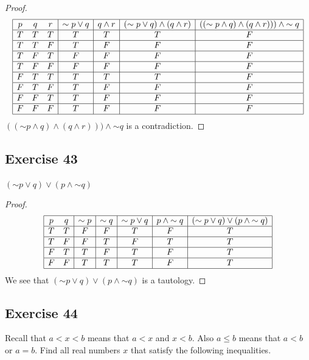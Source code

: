 \documentclass[14pt]{extarticle}
\begin{document}
\begin{proof} 
$$ 
\begin{array}{|ccc|c|c|c|c|} 
\hline 
p & q & r & {\sim p} \vee q & q \wedge r & ({\sim p} \vee q) \wedge (q \wedge r)& (({\sim p} \wedge q) \wedge (q \wedge r))) \wedge {\sim q} \\ 
\hline 
T & T & T & T & T & T & F \\
\hline 
T & T & F & T & F & F & F \\ 
\hline 
T & F & T & F & F & F & F \\ 
\hline 
T & F & F & F & F & F & F \\ 
\hline 
F & T & T & T & T & T & F \\ 
\hline 
F & T & F & T & F & F & F \\ 
\hline 
F & F & T & T & F & F & F \\ 
\hline 
F & F & F & T & F & F & F \\ 
\hline 
\end{array} 
$$ 
$(({\sim p} \wedge q) \wedge (q \wedge r))) \wedge {\sim q}$ is a contradiction. 
\end{proof}

\subsection{Exercise 43} 
$({\sim p} \vee q) \vee (p \wedge {\sim q})$

\begin{proof} 
$$ 
\begin{array}{|cc|c|c|c|c|c|} 
\hline 
p & q & {\sim p} & {\sim q} & {\sim p} \vee q & p \wedge {\sim q} & ({\sim p} \vee q) \vee (p \wedge {\sim q}) \\ 
\hline 
T & T & F & F & T & F & T \\ 
\hline 
T & F & F & T & F & T & T \\ 
\hline 
F & T & T & F & T & F & T \\ 
\hline 
F & F & T & T & T & F & T \\
\hline 
\end{array} 
$$ 
We see that $({\sim p} \vee q) \vee (p \wedge {\sim q})$ is a tautology. 
\end{proof}

\subsection{Exercise 44} 
Recall that $a < x < b$ means that $a < x$ and $x < b$. Also $a \leq b$ means that $a < b$ or $a = b$. Find all real numbers $x$ that satisfy the following inequalities.
\end{document}
